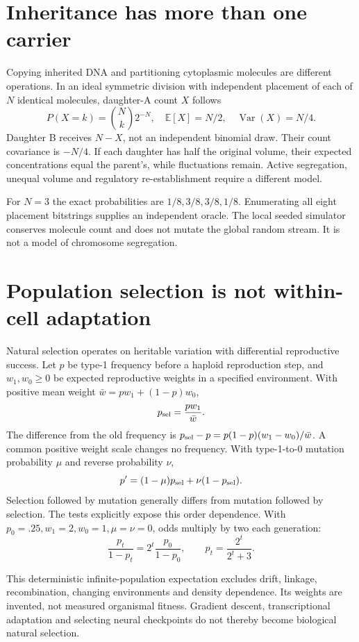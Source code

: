 \section{Inheritance has more than one carrier}
Copying inherited DNA and partitioning cytoplasmic molecules are different
operations. In an ideal symmetric division with independent placement of each of
$N$ identical molecules, daughter-A count $X$ follows
\[
 P(X=k)={N\choose k}2^{-N},\quad
 \mathbb E[X]=N/2,\quad \operatorname{Var}(X)=N/4.
\]
Daughter B receives $N-X$, not an independent binomial draw.
Their count covariance is $-N/4$.
If each daughter has half the original volume, their expected concentrations equal
the parent's, while fluctuations remain. Active segregation, unequal volume and
regulatory re-establishment require a different model.
\begin{center}\end{center}
For $N=3$ the exact probabilities are $1/8,3/8,3/8,1/8$.
Enumerating all eight placement bitstrings supplies an independent oracle.
The local seeded simulator conserves molecule count and does not mutate the global
random stream. It is not a model of chromosome segregation.

\section{Population selection is not within-cell adaptation}
Natural selection operates on heritable variation with differential reproductive
success. Let $p$ be type-1 frequency before a haploid reproduction step,
and $w_1,w_0\ge0$ be expected reproductive weights in a specified environment.
With positive mean weight $\bar w=pw_1+(1-p)w_0$,
\[
 p_{\rm sel}=\frac{pw_1}{\bar w}.
\]
The difference from the old frequency is
$p_{\rm sel}-p=p(1-p)(w_1-w_0)/\bar w$.
A common positive weight scale changes no frequency.
With type-1-to-0 mutation probability $\mu$ and reverse probability $\nu$,
\[
 p'=(1-\mu)p_{\rm sel}+\nu(1-p_{\rm sel}).
\]
Selection followed by mutation generally differs from mutation followed by
selection. The tests explicitly expose this order dependence.
With $p_0=.25,w_1=2,w_0=1,\mu=\nu=0$, odds multiply by two each generation:
\[
 \frac{p_t}{1-p_t}=2^t\frac{p_0}{1-p_0},\qquad
 p_t=\frac{2^t}{2^t+3}.
\]
\begin{center}\end{center}
This deterministic infinite-population expectation excludes drift, linkage,
recombination, changing environments and density dependence. Its weights are
invented, not measured organismal fitness. Gradient descent, transcriptional
adaptation and selecting neural checkpoints do not thereby become biological
natural selection.

